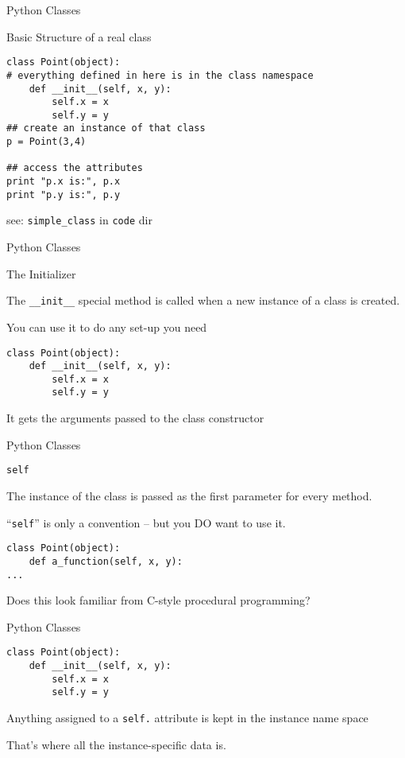 \documentclass{beamer}
\begin{document}
\begin{frame}[fragile]{Python Classes}

{\Large Basic Structure of a real class}

\begin{verbatim}
class Point(object):
# everything defined in here is in the class namespace
    def __init__(self, x, y):
        self.x = x
        self.y = y
## create an instance of that class        
p = Point(3,4)

## access the attributes
print "p.x is:", p.x
print "p.y is:", p.y
\end{verbatim}

see: \verb|simple_class| in \verb|code| dir
\end{frame} 


\begin{frame}[fragile]{Python Classes}

{\LARGE The Initializer}

\vfill
{\Large The \verb|__init__| special method is called when a new instance of a class is created.}

\vfill
{\Large You can use it to do any set-up you need}

\vfill
\begin{verbatim}
class Point(object):
    def __init__(self, x, y):
        self.x = x
        self.y = y
\end{verbatim}
\vfill
{\Large It gets the arguments passed to the class constructor}
\end{frame} 

\begin{frame}[fragile]{Python Classes}

{\LARGE \verb|self|}

\vfill
{\Large The instance of the class is passed as the first parameter for every method.}

\vfill
{\Large ``\verb|self|'' is only a convention -- but you DO want to use it.}

\vfill
\begin{verbatim}
class Point(object):
    def a_function(self, x, y):
...
\end{verbatim}
\vfill
{\Large Does this look familiar from C-style procedural programming?}
\end{frame} 


\begin{frame}[fragile]{Python Classes}

\begin{verbatim}
class Point(object):
    def __init__(self, x, y):
        self.x = x
        self.y = y
\end{verbatim}

\vfill
{\Large Anything assigned to a \verb|self.| attribute is kept in the instance
name space}

\vfill
{\Large That's where all the instance-specific data is.}

\vfill
\end{frame} 
\end{document}
